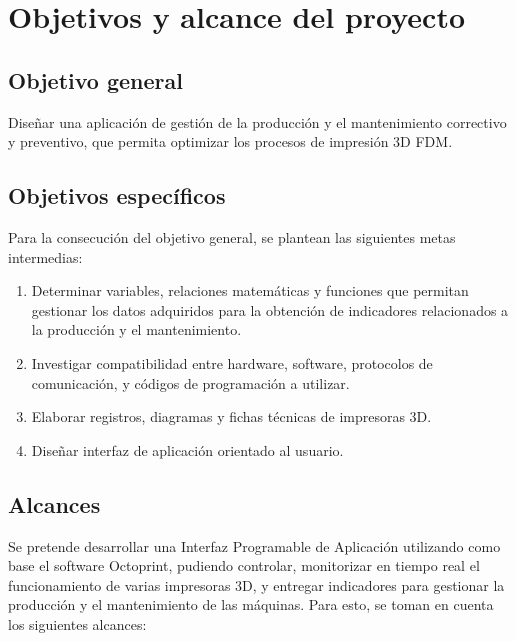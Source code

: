 \section{Objetivos y alcance del proyecto}
\label{intro:objetivos}

\subsection{Objetivo general}

Diseñar una aplicación de gestión de la producción y el mantenimiento correctivo y preventivo, que permita optimizar los procesos de impresión 3D FDM.

\subsection{Objetivos espec\'ificos}

Para la consecución del objetivo general, se plantean las siguientes metas intermedias:

\begin{enumerate}
 	\item Determinar variables, relaciones matemáticas y funciones que permitan gestionar los datos adquiridos para la obtención de indicadores relacionados a la producción y el mantenimiento. 
	\item Investigar compatibilidad entre hardware, software, protocolos de comunicación, y códigos de programación a utilizar.
	\item Elaborar registros, diagramas y fichas técnicas de impresoras 3D.
	\item Diseñar interfaz de aplicación orientado al usuario. 
	
\end{enumerate} 
\clearpage
\subsection{Alcances}

Se pretende desarrollar una Interfaz Programable de Aplicación utilizando como base el software Octoprint, pudiendo controlar, monitorizar en tiempo real el funcionamiento de varias impresoras 3D, y entregar indicadores para gestionar la producción y el mantenimiento de las máquinas. Para esto, se toman en cuenta los siguientes alcances:


